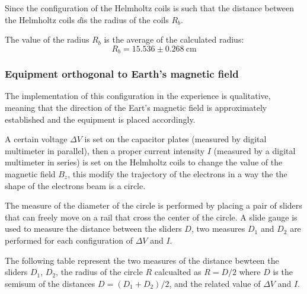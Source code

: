 Since the configuration of the Helmholtz coils is such that the distance between the Helmholtz coils $d$is 
the radius of the coils $R_b$.

The value of the radius $R_b$ is the average of the calculated radius:
\[
    R_b=15.536 \pm 0.268 \ \text{cm}
\]

\subsubsection{Equipment orthogonal to Earth's magnetic field}
The implementation of this configuration in the experience is qualitative, 
meaning that the direction of the Eart's magnetic field is approximately established 
and the equipment is placed accordingly.

A certain voltage $\Delta V$ is set on the capacitor plates (measured by digital multimeter in parallel), then a proper current intensity $I$ (measured by a digital multimeter in series)
is set on the Helmholtz coils to change the value of the magnetic field $B_z$, this modify 
the trajectory of the electrons in a way the the shape of the electrons beam is a circle.

The measure of the diameter of the circle is performed by placing a pair of sliders that can freely move 
on a rail that cross the center of the circle.
A slide gauge is used to measure the distance between the sliders $D$, two measures $D_1$ and $D_2$ are performed for each configuration of $\Delta V$ and $I$.

The following table represent the two measures of the distance bewteen the sliders $D_1$, $D_2$, the radius of the circle $R$ calcualted as $R=D/2$ where $D$ is the semisum of the distances $D=(D_1 + D_2)/2$, and the related value of $\Delta V$ and $I$. 

